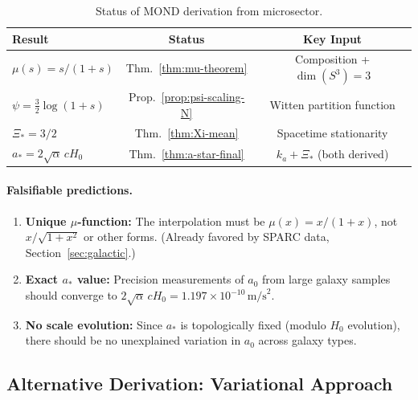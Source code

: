 \begin{table}[h]
\centering
\caption{Status of MOND derivation from microsector.}\label{tab:mu-status}
\small
\begin{ruledtabular}
\begin{tabular}{lcc}
\textbf{Result} & \textbf{Status} & \textbf{Key Input} \\
\hline
$\mu(s) = s/(1+s)$ & Thm.~\ref{thm:mu-theorem} & Composition + $\dim(S^3) = 3$ \\
$\psi = \frac{3}{2}\log(1+s)$ & Prop.~\ref{prop:psi-scaling-N} & Witten partition function \\
$\Xi_* = 3/2$ & Thm.~\ref{thm:Xi-mean} & Spacetime stationarity \\
$a_* = 2\sqrt{\alpha}\,cH_0$ & Thm.~\ref{thm:a-star-final} & $k_a + \Xi_*$ (both derived) \\
\end{tabular}
\end{ruledtabular}
\end{table}

\paragraph{Falsifiable predictions.}
\begin{enumerate}
\item \textbf{Unique $\mu$-function:} The interpolation must be $\mu(x) = x/(1+x)$, not $x/\sqrt{1+x^2}$ or other forms. (Already favored by SPARC data, Section~\ref{sec:galactic}.)

\item \textbf{Exact $a_*$ value:} Precision measurements of $a_0$ from large galaxy samples should converge to $2\sqrt{\alpha}\,cH_0 = 1.197 \times 10^{-10}\,\mathrm{m/s}^2$.

\item \textbf{No scale evolution:} Since $a_*$ is topologically fixed (modulo $H_0$ evolution), there should be no unexplained variation in $a_0$ across galaxy types.
\end{enumerate}

\subsection{Alternative Derivation: Variational Approach}\label{sec:mu-variational}

